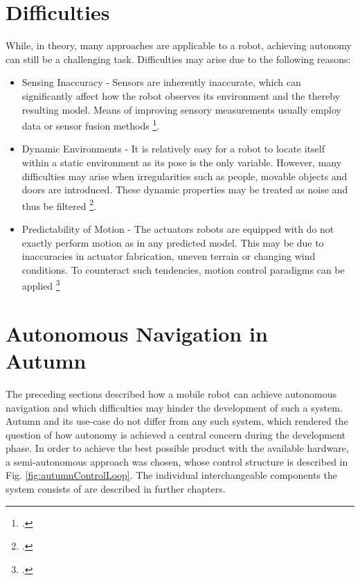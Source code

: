 \section{Difficulties}
While, in theory, many approaches are applicable to a robot, achieving autonomy can still be a challenging task. Difficulties may arise due to the following reasons:
\begin{itemize}
	\item Sensing Inaccuracy - Sensors are inherently inaccurate, which can significantly affect how the robot observes its environment and the thereby resulting model. Means of improving sensory measurements usually employ data or sensor fusion methods \footcite[Page 585]{siciliano2008springer}.
	\item Dynamic Environments - It is relatively easy for a robot to locate itself within a static environment as its pose is the only variable. However, many difficulties may arise when irregularities such as people, movable objects and doors are introduced. These dynamic properties may be treated as noise and thus be filtered \footcite[Pages 159 - 162]{thrun2002probabilisticRobotics}.
	\item Predictability of Motion - The actuators robots are equipped with do not exactly perform motion as in any predicted model. This may be due to inaccuracies in actuator fabrication, uneven terrain or changing wind conditions. To counteract such tendencies, motion control paradigms can be applied \footcite[Page 133]{siciliano2008springer}
\end{itemize}

\section{Autonomous Navigation in Autumn}\label{autumnControlLoop}
The preceding sections described how a mobile robot can achieve autonomous navigation and which difficulties may hinder the development of such a system. Autumn and its use-case do not differ from any such system, which rendered the question of how autonomy is achieved a central concern during the development phase. 
In order to achieve the best possible product with the available hardware, a semi-autonomous approach was chosen, whose control structure is described in Fig. \ref{fig:autumnControlLoop}.
The individual interchangeable components the system consists of are described in further chapters.

